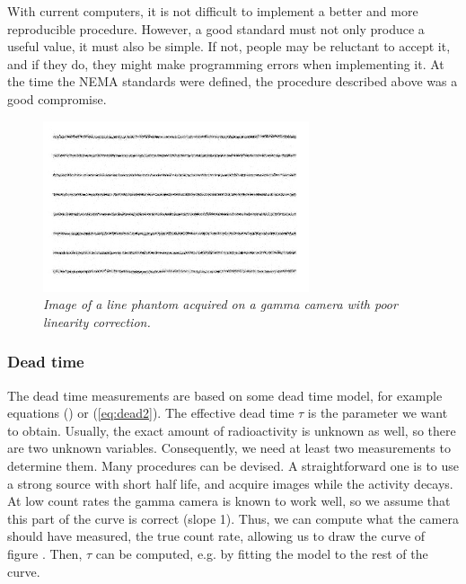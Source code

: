 With current computers, it is not difficult to implement a better and more
reproducible procedure. However, a good standard must not only produce a
useful value, it must also be simple. If not, people may be reluctant to
accept it, and if they do, they might make programming errors when
implementing it. At the time the NEMA standards were defined, the procedure
described above was a good compromise.

\begin{figure}[tb]
\centering
\includegraphics[width=\figone]{figs/fig_qc_linearity.pdf}
\caption{\label{fig:qc_linearity} \emph{Image of a line phantom acquired on a
gamma camera with poor linearity correction.}}
\end{figure}

\subsubsection{Dead time}
The dead time measurements are based on some dead time model, for example
equations () or (\ref{eq:dead2}). The effective dead time $\tau$
is the parameter we want to obtain. Usually, the exact amount of radioactivity
is unknown as well, so there are two unknown variables. Consequently, we need
at least two measurements to determine them. Many procedures can be devised. A
straightforward one is to use a strong source with short half life, and
acquire images while the activity decays. At low count rates the gamma camera
is known to work well, so we assume that this part of the curve is correct
(slope 1). Thus, we can compute what the camera should have measured, the true
count rate, allowing us to draw the curve of figure . Then,
$\tau$ can be computed, e.g. by fitting the model to the rest of the curve.

